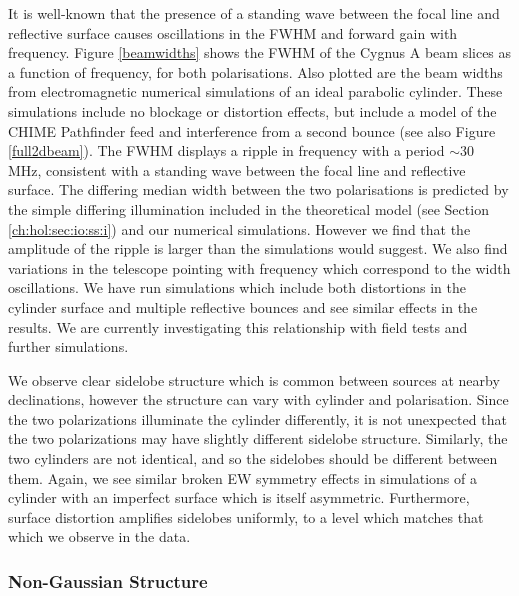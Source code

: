 It is well-known \citep{wander1, wander2} that the presence of a standing wave between the focal line and reflective surface causes oscillations in the FWHM and forward gain with frequency. Figure \ref{beamwidths} shows the FWHM of the Cygnus A beam slices as a function of frequency, for both polarisations. Also plotted are the beam widths from electromagnetic numerical simulations of an ideal parabolic cylinder. These simulations include no blockage or distortion effects, but include a model of the CHIME Pathfinder feed \citep{meiling} and interference from a second bounce (see also Figure \ref{full2dbeam}). The FWHM displays a ripple in frequency with a period $\sim$30 MHz, consistent with a standing wave between the focal line and reflective surface. The differing median width between the two polarisations is predicted by the simple differing illumination included in the theoretical model (see Section \ref{ch:hol:sec:io:ss:i}) and our numerical simulations. However we find that the amplitude of the ripple is larger than the simulations would suggest. We also find variations in the telescope pointing with frequency which correspond to the width oscillations. We have run simulations which include both distortions in the cylinder surface and multiple reflective bounces and see similar effects in the results. We are currently investigating this relationship with field tests and further simulations.

We observe clear sidelobe structure which is common between sources at nearby declinations, however the structure can vary with cylinder and polarisation. Since the two polarizations illuminate the cylinder differently, it is not unexpected that the two polarizations may have slightly different sidelobe structure. Similarly, the two cylinders are not identical, and so the sidelobes should be different between them. Again, we see similar broken EW symmetry effects in simulations of a cylinder with an imperfect surface which is itself asymmetric. Furthermore, surface distortion amplifies sidelobes uniformly, to a level which matches that which we observe in the data.

\subsubsection{Non-Gaussian Structure}


